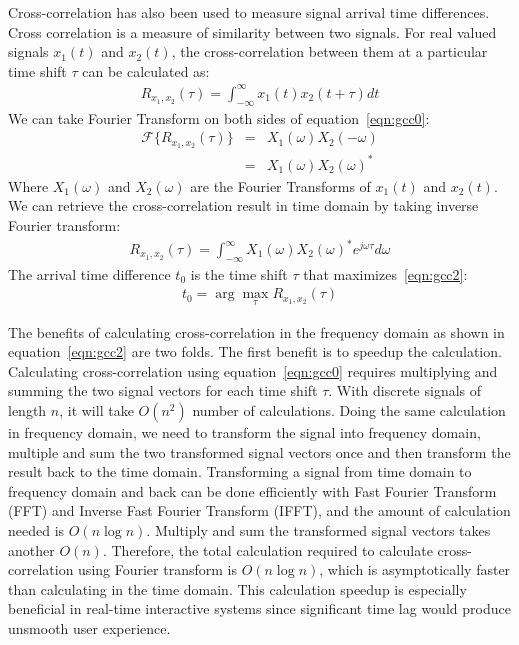 Cross-correlation has also been used to measure signal arrival time differences\cite{tdoa:mit2, tdoa:micloc, tdoa:3}.  Cross correlation is a measure of similarity between two signals. For real valued signals $x_1(t)$ and $x_2(t)$, the cross-correlation between them at a particular time shift $\tau$ can be calculated as:
\begin{eqnarray}\label{eqn:gcc0}
 R_{x_1,x_2}(\tau) = \int_{-\infty}^{\infty} x_1(t) x_2(t+\tau)dt
\end{eqnarray}
We can take Fourier Transform on both sides of equation~\ref{eqn:gcc0}:
\begin{eqnarray}\label{eqn:gcc1}
\mathcal{F}\{ R_{x_1,x_2}(\tau)\} & = & X_1(\omega) X_2(-\omega)\\
& =& X_1(\omega) X_2(\omega)^*
\end{eqnarray}
Where $X_1(\omega)$ and $X_2(\omega)$ are the Fourier Transforms of $x_1(t)$ and $x_2(t)$. We can retrieve the cross-correlation result in time domain by taking inverse Fourier transform:
\begin{eqnarray}\label{eqn:gcc2}
 R_{x_1,x_2}(\tau) = \int_{-\infty}^\infty X_1(\omega)X_2(\omega)^*e^{j\omega\tau} d\omega
\end{eqnarray}
The arrival time difference $t_0$ is the time shift $\tau$ that maximizes~\ref{eqn:gcc2}:
\begin{eqnarray}\label{eqn:gcc3}
t_0 = \arg\max_\tau R_{x_1,x_2}(\tau) 
\end{eqnarray}

The benefits of calculating cross-correlation in the frequency domain as shown in equation~\ref{eqn:gcc2} are two folds. The first benefit is to speedup the calculation. Calculating cross-correlation using equation~\ref{eqn:gcc0} requires multiplying and summing the two signal vectors for each time shift $\tau$. With discrete signals of length $n$, it will take $O(n^2)$ number of calculations. Doing the same calculation in frequency domain, we need to transform the signal into frequency domain, multiple and sum the two transformed signal vectors once and then transform the result back to the time domain. Transforming a signal from time domain to frequency domain and back can be done efficiently with Fast Fourier Transform (FFT) and Inverse Fast Fourier Transform (IFFT), and the amount of calculation needed is $O(n\log n)$. Multiply and sum the transformed signal vectors takes another $O(n)$. Therefore, the total calculation required to calculate cross-correlation using Fourier transform is $O(n\log n)$, which is asymptotically faster than calculating in the time domain. This calculation speedup is especially beneficial in real-time interactive systems since significant time lag would produce unsmooth user experience.

